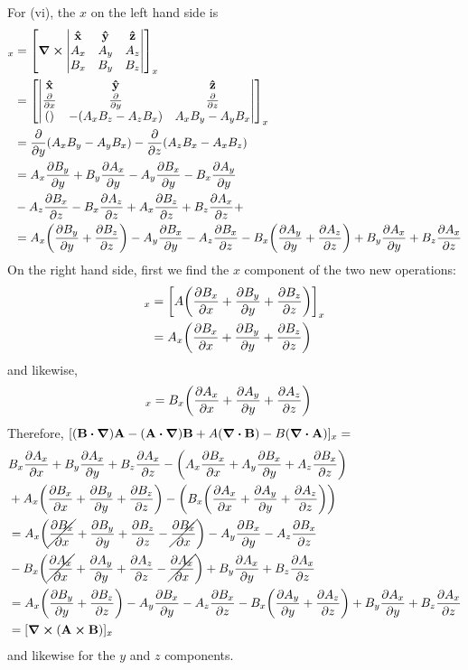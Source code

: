 \documentclass[../main.tex]{subfiles}
\begin{document}
For (vi), the $x$ on the left hand side is
\begin{align*}
    [\curl(\vb{A} \cp \vb{B})]_x &= \qt[\curl \begin{vmatrix}
        \vu{x} & \vu{y} & \vu{z} \\
        A_x & A_y & A_z \\
        B_x & B_y & B_z
    \end{vmatrix}]_x \\
    &= \qt[\begin{vmatrix}
        \vu{x} & \vu{y} & \vu{z} \\
        \pdv{x} & \pdv{y} & \pdv{z} \\
        () & -(A_xB_z - A_zB_x) & A_xB_y - A_yB_x
    \end{vmatrix}]_x \\
    &= \pdv{y}(A_xB_y - A_yB_x) - \pdv{z}(A_zB_x - A_xB_z) \\
    &= A_x \pdv{B_y}{y} + B_y \pdv{A_x}{y} - A_y \pdv{B_x}{y} - B_x \pdv{A_y}{y} \\
        &- A_z \pdv{B_x}{z} - B_x \pdv{A_z}{z} + A_x \pdv{B_z}{z} + B_z \pdv{A_x}{z} +  \\
    &= A_x \qt(\pdv{B_y}{y} + \pdv{B_z}{z}) - A_y \pdv{B_x}{y} - A_z \pdv{B_x}{z} 
        - B_x \qt(\pdv{A_y}{y} + \pdv{A_z}{z}) + B_y \pdv{A_x}{y} + B_z \pdv{A_x}{z}
\end{align*}
On the right hand side, first we find the $x$ component of the two new operations:
\begin{align*}
    [A (\grad \vdot \vb{B})]_x &= \qt[A \qt(\pdv{B_x}{x} + \pdv{B_y}{y} + \pdv{B_z}{z})]_x \\
    &= A_x \qt(\pdv{B_x}{x} + \pdv{B_y}{y} + \pdv{B_z}{z})
\end{align*}
and likewise,
\begin{align*}
    [B (\grad \vdot \vb{A})]_x &= B_x \qt(\pdv{A_x}{x} + \pdv{A_y}{y} + \pdv{A_z}{z})
\end{align*}
Therefore, $[(\vb{B} \vdot \grad) \vb{A} - (\vb{A} \vdot \grad) \vb{B} + A (\grad \vdot \vb{B})
- B (\grad \vdot \vb{A})]_x =$
\begin{align*}
    &B_x \pdv{A_x}{x} + B_y \pdv{A_x}{y} + B_z \pdv{A_x}{z} -  
        \qt(A_x \pdv{B_x}{x} + A_y \pdv{B_x}{y} + A_z \pdv{B_x}{z}) \\
        &+ A_x \qt(\pdv{B_x}{x} + \pdv{B_y}{y} + \pdv{B_z}{z}) -
        \qt(B_x \qt(\pdv{A_x}{x} + \pdv{A_y}{y} + \pdv{A_z}{z})) \\
    &= A_x \qt(
        \cancel{\pdv{B_x}{x}} + \pdv{B_y}{y} + \pdv{B_z}{z} -
        \cancel{\pdv{B_x}{x}}) 
            - A_y \pdv{B_x}{y} - A_z \pdv{B_x}{z} \\
        &- B_x \qt(
            \cancel{\pdv{A_x}{x}} + \pdv{A_y}{y} + \pdv{A_z}{z} - 
            \cancel{\pdv{A_x}{x}})
            + B_y \pdv{A_x}{y} + B_z \pdv{A_x}{z} \\
    &= A_x \qt(\pdv{B_y}{y} + \pdv{B_z}{z}) - A_y \pdv{B_x}{y} - A_z \pdv{B_x}{z} 
    - B_x \qt(\pdv{A_y}{y} + \pdv{A_z}{z}) + B_y \pdv{A_x}{y} + B_z \pdv{A_x}{z} \\
    &= [\curl(\vb{A} \cp \vb{B})]_x 
\end{align*} 
and likewise for the $y$ and $z$ components.
\end{document}
